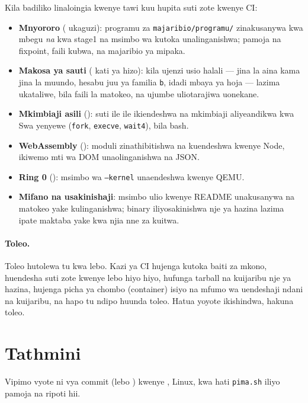 \documentclass[11pt,a4paper]{article}
\begin{document}
Kila badiliko linaloingia kwenye tawi kuu hupita suti zote kwenye CI:

\begin{itemize}
  \item \textbf{Mnyororo} (\MnyororoJumla{} ukaguzi): programu \MajaribioProgramu{} za \texttt{majaribio/programu/} zinakusanywa kwa mbegu \emph{na} kwa stage1 na msimbo wa kutoka unalinganishwa; pamoja na fixpoint, faili kubwa, na majaribio ya mipaka.
  \item \textbf{Makosa ya sauti} (\MajaribioKata{} kati ya hizo): kila ujenzi usio halali --- jina la aina kama jina la muundo, hesabu juu ya familia \texttt{b}, idadi mbaya ya hoja --- lazima ukataliwe, bila faili la matokeo, na ujumbe uliotarajiwa uonekane.
  \item \textbf{Mkimbiaji asili} (\AsiliJumla): suti ile ile ikiendeshwa na mkimbiaji aliyeandikwa kwa Swa yenyewe (\texttt{fork}, \texttt{execve}, \texttt{wait4}), bila bash.
  \item \textbf{WebAssembly} (\WasmJumla): moduli zinathibitishwa na kuendeshwa kwenye Node, ikiwemo mti wa DOM unaolinganishwa na JSON.
  \item \textbf{Ring 0} (\KernelJumla): msimbo wa \texttt{--kernel} unaendeshwa kwenye QEMU.
  \item \textbf{Mifano na usakinishaji}: msimbo ulio kwenye README unakusanywa na matokeo yake kulinganishwa; binary iliyosakinishwa nje ya hazina lazima ipate maktaba yake kwa njia nne za kuitwa.
\end{itemize}

\paragraph{Toleo.} Toleo hutolewa tu kwa lebo. Kazi ya CI hujenga kutoka baiti za mkono, huendesha suti zote kwenye lebo hiyo hiyo, hufunga tarball na kuijaribu nje ya hazina, hujenga picha ya chombo (container) isiyo na mfumo wa uendeshaji ndani na kuijaribu, na hapo tu ndipo huunda toleo. Hatua yoyote ikishindwa, hakuna toleo.

\section{Tathmini}\label{sec:tathmini}

Vipimo vyote ni vya commit \Commit{} (lebo \Toleo) kwenye \Cpu, Linux, kwa hati \texttt{pima.sh} iliyo pamoja na ripoti hii.
\end{document}
